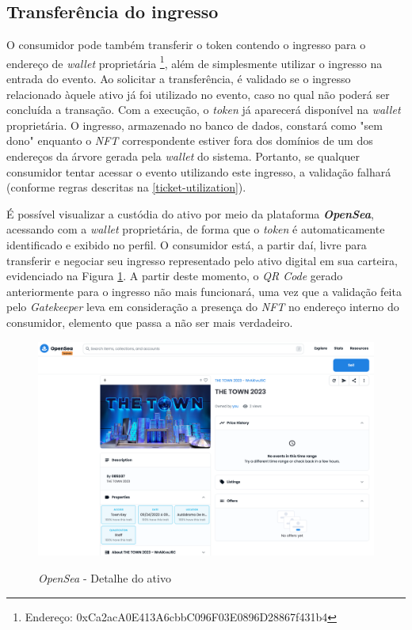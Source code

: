{\subsection{\esp Transferência do ingresso}

O consumidor pode também transferir o token contendo o ingresso para o endereço de \textit{wallet} proprietária \footnote{Endereço: 0xCa2acA0E413A6cbbC096F03E0896D28867f431b4}, além de simplesmente utilizar o ingresso na entrada do evento. Ao solicitar a transferência, é validado se o ingresso relacionado àquele ativo já foi utilizado no evento, caso no qual não poderá ser concluída a transação. Com a execução, o \textit{token} já aparecerá disponível na \textit{wallet} proprietária. O ingresso, armazenado no banco de dados, constará como "sem dono" enquanto o \textit{NFT} correspondente estiver fora dos domínios de um dos endereços da árvore gerada pela \textit{wallet} do sistema. Portanto, se qualquer consumidor tentar acessar o evento utilizando este ingresso, a validação falhará (conforme regras descritas na \ref{ticket-utilization}).

É possível visualizar a custódia do ativo por meio da plataforma \textit{\textbf{OpenSea}}, acessando com a \textit{wallet} proprietária, de forma que o \textit{token} é automaticamente identificado e exibido no perfil. O consumidor está, a partir daí, livre para transferir e negociar seu ingresso representado pelo ativo digital em sua carteira, evidenciado na Figura \ref{fig:opensea}. A partir deste momento, o \textit{QR Code} gerado anteriormente para o ingresso não mais funcionará, uma vez que a validação feita pelo \textit{Gatekeeper} leva em consideração a presença do \textit{NFT} no endereço interno do consumidor, elemento que passa a não ser mais verdadeiro.

\begin{figure}[ht]
    \centering
    \caption{\textit{OpenSea} - Detalhe do ativo}
    \includegraphics[scale=0.25]{figuras/opensea.png}
    \label{fig:opensea}
\end{figure}

}
